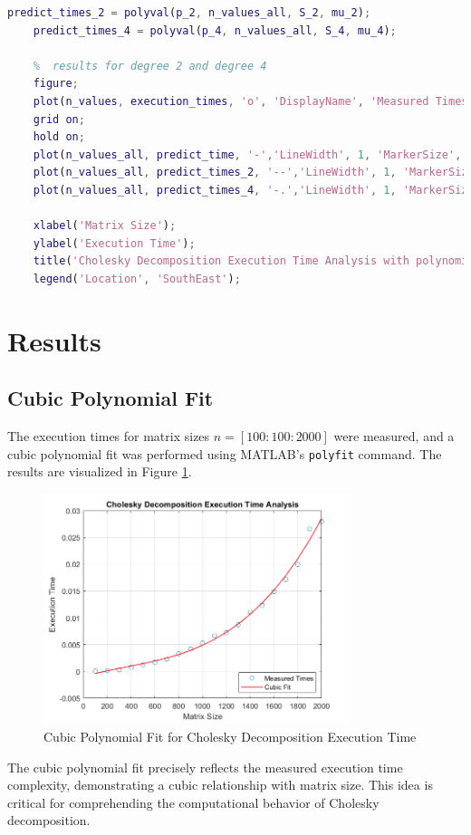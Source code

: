\begin{center}
\begin{lstlisting}[language=MATLAB, caption=Time Analysis Source Code]
    predict_times_2 = polyval(p_2, n_values_all, S_2, mu_2);
    predict_times_4 = polyval(p_4, n_values_all, S_4, mu_4);

    %  results for degree 2 and degree 4
    figure;
    plot(n_values, execution_times, 'o', 'DisplayName', 'Measured Times');
    grid on;
    hold on;
    plot(n_values_all, predict_time, '-','LineWidth', 1, 'MarkerSize', 8, 'Color', 'red', 'DisplayName', 'Cubic Fit');
    plot(n_values_all, predict_times_2, '--','LineWidth', 1, 'MarkerSize', 8, 'Color', 'green', 'DisplayName', 'Degree 2 Fit');
    plot(n_values_all, predict_times_4, '-.','LineWidth', 1, 'MarkerSize', 8, 'Color','blue', 'DisplayName', 'Degree 4 Fit');

    xlabel('Matrix Size');
    ylabel('Execution Time');
    title('Cholesky Decomposition Execution Time Analysis with polynomial 2 and 4');
    legend('Location', 'SouthEast');

\end{lstlisting}
\end{center}
\newpage
\section*{Results}
\subsection*{Cubic Polynomial Fit}
The execution times for matrix sizes $n = [100:100:2000]$ were measured, and a cubic polynomial fit was performed using MATLAB's \texttt{polyfit} command. The results are visualized in Figure \ref{fig:cubic_fit}.

\begin{figure}[ht]
    \centering
    \includegraphics[width=0.8\textwidth]{Chapters/Predicted.png}
    \caption{Cubic Polynomial Fit for Cholesky Decomposition Execution Time}
    \label{fig:cubic_fit}
\end{figure}
The cubic polynomial fit precisely reflects the measured execution time complexity, demonstrating a cubic relationship with matrix size. This idea is critical for comprehending the computational behavior of Cholesky decomposition.

